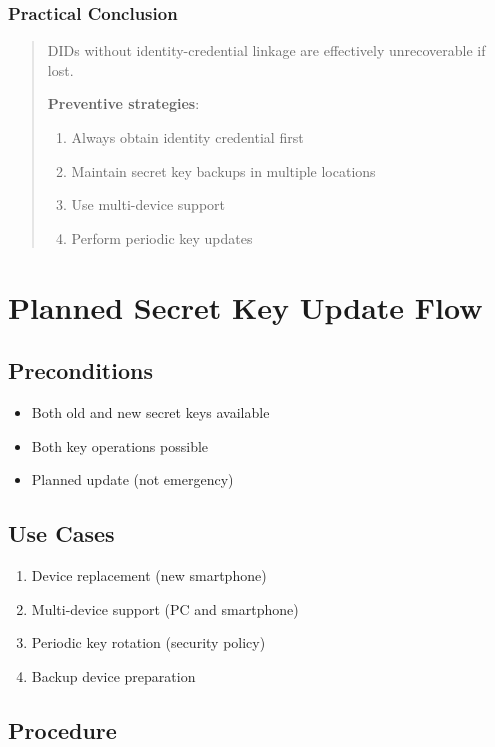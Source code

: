 \subsubsection{Practical Conclusion}

\begin{quote}
DIDs without identity-credential linkage are effectively unrecoverable if lost.

\textbf{Preventive strategies}:
\begin{enumerate}
  \item Always obtain identity credential first
  \item Maintain secret key backups in multiple locations
  \item Use multi-device support
  \item Perform periodic key updates
\end{enumerate}
\end{quote}

\section{Planned Secret Key Update Flow}

\subsection{Preconditions}

\begin{itemize}
  \item Both old and new secret keys available
  \item Both key operations possible
  \item Planned update (not emergency)
\end{itemize}

\subsection{Use Cases}

\begin{enumerate}
  \item Device replacement (new smartphone)
  \item Multi-device support (PC and smartphone)
  \item Periodic key rotation (security policy)
  \item Backup device preparation
\end{enumerate}

\subsection{Procedure}

